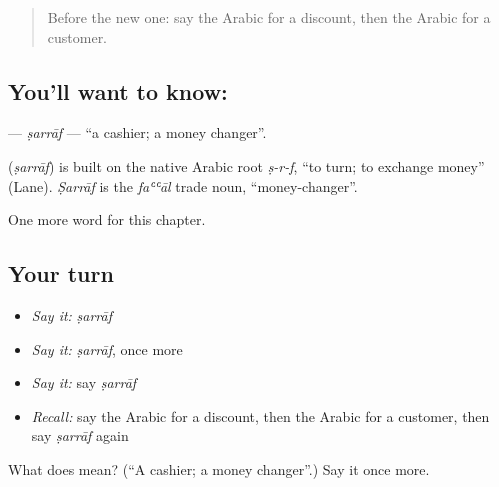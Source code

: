 \label{lesson:AR-C188-sarraf}



\begin{quote}
Before the new one: say the Arabic for a discount, then the Arabic for a customer.
\end{quote}

\subsection*{You'll want to know: }
\textbf{} — \emph{ṣarrāf} — \textquotedblleft{}a cashier; a money changer\textquotedblright{}.

\begin{cousinweb}
\textbf{} (\emph{ṣarrāf}) is built on the native Arabic root \emph{ṣ-r-f}, \textquotedblleft{}to turn; to exchange money\textquotedblright{} (Lane). \emph{Ṣarrāf} is the \emph{faʿʿāl} trade noun, \textquotedblleft{}money-changer\textquotedblright{}.
\end{cousinweb}

\begin{grammarlens}[title={What you've built}]
One more word for this chapter.
\end{grammarlens}

\subsection*{Your turn}
\begin{itemize}
\raggedright
  \item \emph{Say it:} \emph{ṣarrāf}
  \item \emph{Say it:} \emph{ṣarrāf}, once more
  \item \emph{Say it:} say \emph{ṣarrāf}
  \item \emph{Recall:} say the Arabic for a discount, then the Arabic for a customer, then say \emph{ṣarrāf} again
\end{itemize}

\begin{tcolorbox}[breakable,colback=teal!4,colframe=teal!35!black,title={Before you move on}]
What does  mean? (\textquotedblleft{}A cashier; a money changer\textquotedblright{}.) Say it once more.
\end{tcolorbox}
